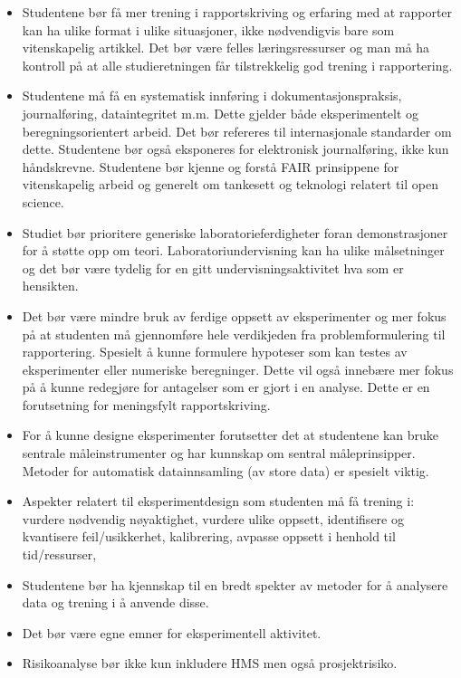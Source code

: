 \begin{itemize}
	\item Studentene bør få mer trening i rapportskriving og erfaring med at rapporter kan ha ulike format i ulike situasjoner, ikke nødvendigvis bare som vitenskapelig artikkel. Det bør være felles læringsressurser og man må ha kontroll på at alle studieretningen får tilstrekkelig god trening i rapportering.
	\item Studentene må få en systematisk innføring i dokumentasjonspraksis, journalføring, dataintegritet m.m. Dette gjelder både eksperimentelt og beregningsorientert arbeid. Det bør refereres til internasjonale standarder om dette. Studentene bør også eksponeres for elektronisk journalføring, ikke kun håndskrevne. Studentene bør kjenne og forstå FAIR prinsippene for vitenskapelig arbeid og generelt om tankesett og teknologi relatert til open science.
	\item Studiet bør prioritere generiske laboratorieferdigheter foran demonstrasjoner for å støtte opp om teori. Laboratoriundervisning kan ha ulike målsetninger og det bør være tydelig for en gitt undervisningsaktivitet hva som er hensikten.
	\item Det bør være mindre bruk av ferdige oppsett av eksperimenter og mer fokus på at studenten må gjennomføre hele verdikjeden fra problemformulering til rapportering. Spesielt å kunne formulere hypoteser som kan testes av eksperimenter eller numeriske beregninger. Dette vil også innebære mer fokus på å kunne redegjøre for antagelser som er gjort i en analyse. Dette er en forutsetning for meningsfylt rapportskriving.
	\item For å kunne designe eksperimenter forutsetter det at studentene kan bruke sentrale måleinstrumenter og har kunnskap om sentral måleprinsipper. Metoder for automatisk datainnsamling (av store data) er spesielt viktig.
	\item Aspekter relatert til eksperimentdesign som studenten må få trening i: vurdere nødvendig nøyaktighet, vurdere ulike oppsett, identifisere og kvantisere feil/usikkerhet, kalibrering, avpasse oppsett i henhold til tid/ressurser,
	\item Studentene bør ha kjennskap til en bredt spekter av metoder for å analysere data og trening i å anvende disse.
	\item Det bør være egne emner for eksperimentell aktivitet.
	\item Risikoanalyse bør ikke kun inkludere HMS men også prosjektrisiko.
\end{itemize}

